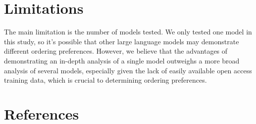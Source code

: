 \documentclass[
  nottoc]{article}
\begin{document}
\section{Limitations}\label{limitations}

The main limitation is the number of models tested. We only tested one
model in this study, so it's possible that other large language models
may demonstrate different ordering preferences. However, we believe that
the advantages of demonstrating an in-depth analysis of a single model
outweighs a more broad analysis of several models, especially given the
lack of easily available open access training data, which is crucial to
determining ordering preferences.

\clearpage

\section*{References}\label{references}
\end{document}
